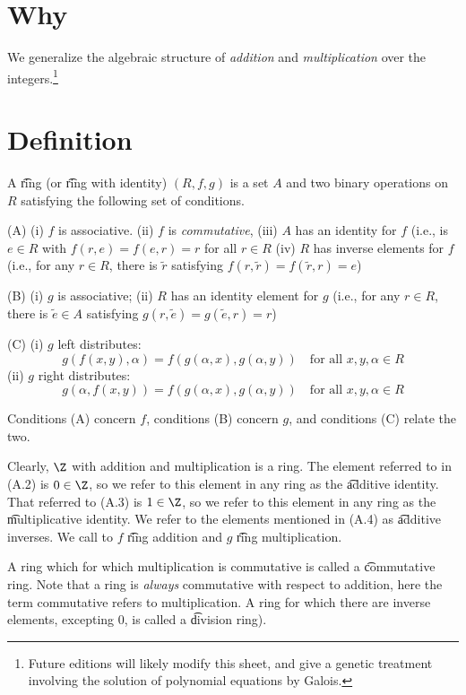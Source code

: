 
\section*{Why}

We generalize the algebraic structure of \textit{addition} and \textit{multiplication} over the integers.\footnote{Future editions will likely modify this sheet, and give a genetic treatment involving the solution of polynomial equations by Galois.}

\section*{Definition}

A \t{ring} (or \t{ring with identity}) $(R, f, g)$ is a set $A$ and two binary operations on $R$ satisfying the following set of conditions.

(A)
(i) $f$ is associative.
(ii) $f$ is \textit{commutative},
(iii) $A$ has an identity for $f$ (i.e., is $e \in R$ with $f(r, e) = f(e, r) = r$ for all $r \in R$
(iv) $R$ has inverse elements for $f$ (i.e., for any $r \in R$, there is $\tilde{r} $ satisfying $f(r,\tilde{r}) = f(\tilde{r}, r) = e$)

(B)
(i) $g$ is associative;
(ii) $R$ has an identity element for $g$ (i.e., for any $r \in R$, there is $\tilde{e} \in A$ satisfying $g(r, \tilde{e}) = g(\tilde{e},r) = r$)

(C)
(i) $g$ left distributes:
\[
g(f(x, y), \alpha ) = f(g(\alpha ,x), g(\alpha ,y)) \quad \text{for all } x, y, \alpha  \in R
\]
(ii) $g$ right distributes:
\[
g(\alpha , f(x,y)) = f(g(\alpha ,x), g(\alpha ,y)) \quad \text{for all } x, y, \alpha  \in R
\]

Conditions (A) concern $f$, conditions (B) concern $g$, and conditions (C) relate the two.

Clearly, $\Z $ with addition and multiplication is a ring.
The element referred to in (A.2) is $0 \in \Z $, so we refer to this element in any ring as the \t{additive identity}.
That referred to (A.3) is $1 \in \Z $, so we refer to this element in any ring as the \t{multiplicative identity}.
We refer to the elements mentioned in (A.4) as \t{additive inverses}.
We call to $f$ \t{ring addition} and $g$ \t{ring multiplication}.


%    

A ring which for which multiplication is commutative is called a \t{commutative ring}.
Note that a ring is \textit{always} commutative with respect to addition, here the term commutative refers to multiplication.
A ring for which there are inverse elements, excepting 0, is called a \t{division ring}).

